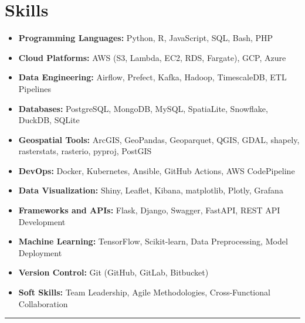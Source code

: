 \documentclass[10pt]{article}%
\begin{document}
\section*{\faCogs{} Skills}
\begin{itemize}[label={\faCheckCircle}, leftmargin=7em]
    \setlength\itemsep{0.3em}
    \item \textbf{Programming Languages:} Python, R, JavaScript, SQL, Bash, PHP
    \item \textbf{Cloud Platforms:} AWS (S3, Lambda, EC2, RDS, Fargate), GCP, Azure
    \item \textbf{Data Engineering:} Airflow, Prefect, Kafka, Hadoop, TimescaleDB, ETL Pipelines
    \item \textbf{Databases:} PostgreSQL, MongoDB, MySQL, SpatiaLite, Snowflake, DuckDB, SQLite
    \item \textbf{Geospatial Tools:} ArcGIS, GeoPandas, Geoparquet, QGIS, GDAL, shapely, rasterstats, rasterio, pyproj, PostGIS
    \item \textbf{DevOps:} Docker, Kubernetes, Ansible, GitHub Actions, AWS CodePipeline
    \item \textbf{Data Visualization:} Shiny, Leaflet, Kibana, matplotlib, Plotly, Grafana
    \item \textbf{Frameworks and APIs:} Flask, Django, Swagger, FastAPI, REST API Development
    \item \textbf{Machine Learning:} TensorFlow, Scikit-learn, Data Preprocessing, Model Deployment
    \item \textbf{Version Control:} Git (GitHub, GitLab, Bitbucket)
    \item \textbf{Soft Skills:} Team Leadership, Agile Methodologies, Cross-Functional Collaboration
\end{itemize}
\par\noindent\rule{\textwidth}{0.4pt}
\end{document}
